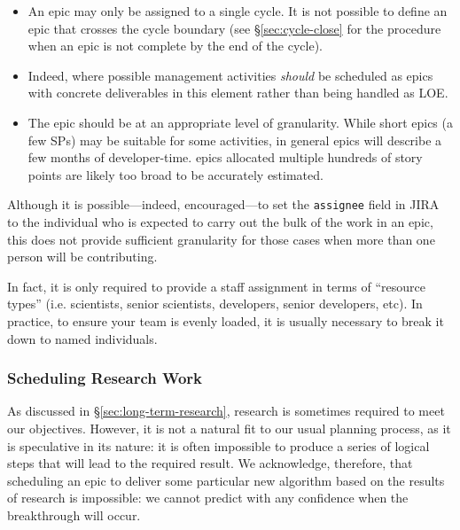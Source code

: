 \begin{itemize}
\item
  An \gls{epic} may only be assigned to a single \gls{cycle}.
  It is not possible to define an \gls{epic} that crosses the \gls{cycle} boundary (see \S\ref{sec:cycle-close} for the procedure when an \gls{epic} is not complete by the end of the \gls{cycle}).
\item
  Indeed, where possible management activities \emph{should} be scheduled as \glspl{epic} with concrete deliverables in this \gls{element} rather than being handled as \gls{LOE}.
\item
  The \gls{epic} should be at an appropriate level of granularity.
  While short \glspl{epic} (a few \glspl{SP}) may be suitable for some activities, in general \glspl{epic} will describe a few months of developer-time.
  \Glspl{epic} allocated multiple hundreds of \gls{story} points are likely too broad to be accurately estimated.
\end{itemize}


Although it is possible---indeed, encouraged---to set the \texttt{assignee} field in \gls{JIRA} to the individual who is expected to carry out the bulk of the work in an \gls{epic}, this does not provide sufficient granularity for those cases when more than one person will be contributing.

In fact, it is only required to provide a staff assignment in terms of ``resource types'' (i.e. scientists, senior scientists, developers, senior developers, etc).
In practice, to ensure your team is evenly loaded, it is usually necessary to break it down to named individuals.


\subsubsection{Scheduling Research Work}
\label{sec:research}

As discussed in \S\ref{sec:long-term-research}, research is sometimes required
to meet our objectives. However, it is not a natural fit to our usual
planning process, as it is speculative in its nature: it is often
impossible to produce a series of logical steps that will lead to the
required result. We acknowledge, therefore, that scheduling an \gls{epic} to
deliver some particular new \gls{algorithm} based on the results of research
is impossible: we cannot predict with any confidence when the
breakthrough will occur.

